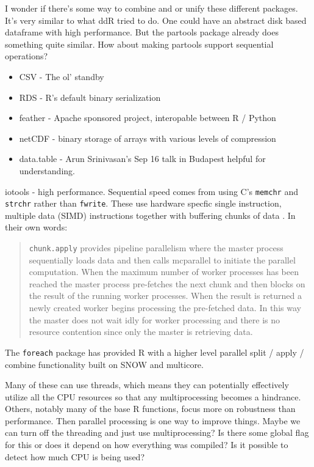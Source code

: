 \documentclass[12pt]{article}
\begin{document}
I wonder if there's some way to combine and or unify these different
packages. It's very similar to what ddR tried to do. One could have an
abstract disk based dataframe with high performance. But the partools package already does
something quite similar. How about making partools support sequential
operations?


\begin{itemize}
    \item CSV - The ol' standby
    \item RDS - R's default binary serialization
    \item feather - Apache sponsored project, interopable between R /
        Python
    \item netCDF - binary storage of arrays with various levels of
        compression
    \item data.table - Arun Srinivasan's Sep 16 talk in Budapest helpful
        for understanding.

\end{itemize}


iotools - high performance. Sequential speed comes from
using C's \texttt{memchr} and \texttt{strchr} rather than \texttt{fwrite}.
These use hardware specfic single instruction, multiple data (SIMD)
instructions together with buffering chunks of data
\cite{arnold2015iotools}. In their own words:

\begin{quote}
    \texttt{chunk.apply} provides pipeline parallelism
    where the master process sequentially loads data and then calls
    mcparallel to initiate the parallel computation. When the maximum
    number of worker processes has been reached the master process
    pre-fetches the next chunk and then blocks on the result of the running
    worker processes. When the result is returned a newly created worker
    begins processing the pre-fetched data. In this way the master does not
    wait idly for worker processing and there is no resource contention
    since only the master is retrieving data. \cite{arnold2015iotools}
\end{quote}

The \texttt{foreach} package has provided R with a higher level parallel
split / apply / combine functionality built on SNOW and multicore.

Many of these can use threads, which means they can potentially effectively
utilize all the CPU resources so that any multiprocessing becomes a hindrance.
Others, notably many of the base R functions, focus more on robustness than
performance. Then parallel processing is one way to improve things.
Maybe we can turn off the threading and just use multiprocessing? Is there
some global flag for this or does it depend on how everything was compiled?
Is it possible to detect how much CPU is being used?
\end{document}

